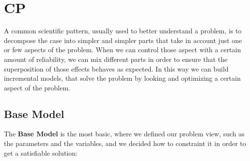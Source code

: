 \chapter{CP}
A common scientific pattern, usually used to better understand a problem, is to decompose the case into
simpler and simpler parts that take in account just one or few aspects of the problem.
When we can control those aspect with a certain amount of reliability, we can mix different parts in order to
ensure that the superposition of those effects behaves as expected.
In this way we can build incremental models, that solve the problem by looking and optimizing a certain aspect
of the problem. 

\section{Base Model}
The \textbf{Base Model} is the most basic, where we defined our problem view, such as the parameters and the variables,
and we decided how to constraint it in order to get a satisfiable solution:

